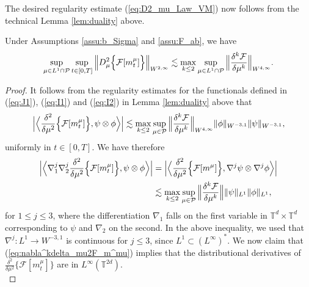 The desired regularity estimate (\ref{eq:D2_mu_Law_VM}) now follows from the technical Lemma \ref{lem:duality} above.

\begin{cor}\label{thm:reg_D_mu2F_m_mu} Under Assumptions \ref{assu:b_Sigma} and \ref{assu:F_ab}, we have
\begin{equation}\label{eq:reg_D_mu2}
\sup_{\mu \in L^1 \cap \mathcal{P}} \sup_{t \in [0,T] } \Big\| D_{\mu}^2\Big\{\mathcal{F}[m_t^{\mu}]\Big\}\Big\|_{W^{2,\infty}} \lesssim \max_{k \leq 2}\sup_{\mu \in L^1 \cap \mathcal{P}}\Big\|\frac{\delta^k \mathcal{F}}{\delta \mu^k}  \Big\|_{W^{4,\infty}}.
\end{equation}
\end{cor}

\begin{proof}
It follows from the regularity estimates for the functionals defined in (\ref{eq:J1}), (\ref{eq:I1}) and (\ref{eq:I2}) in Lemma \ref{lem:duality} above that
\begin{equation*}
\Big|\Big\langle \frac{\delta^2}{\delta \mu^2}\Big\{\mathcal{F}[m_t^{\mu}]\Big\}, \psi\otimes \phi \Big\rangle\Big| \lesssim \max_{k \leq 2} \sup_{\mu \in \mathcal{P}}\Big\|\frac{\delta^k \mathcal{F}}{\delta \mu^k}  \Big\|_{W^{4,\infty}} \|\phi\|_{W^{-3,1}} \|\psi\|_{W^{-3,1}},
\end{equation*}
uniformly in $t \in [0,T]$. We have therefore
\begin{equation}\label{eq:nabla^kdelta_mu2F_m^mu}
\begin{split}
\Big|\Big\langle \nabla_1^j \nabla_2^j \frac{\delta^2}{\delta \mu^2}\Big\{\mathcal{F}[m_t^{\mu}]\Big\}, \psi\otimes \phi \Big\rangle\Big| & = \Big|\Big\langle \frac{\delta^2}{\delta \mu^2}\Big\{\mathcal{F}[m^{\mu}]\Big\},  \nabla^j\psi\otimes  \nabla^j\phi \Big\rangle\Big| \\
& \lesssim\max_{k \leq 2} \sup_{\mu \in \mathcal{P}}\Big\|\frac{\delta^k \mathcal{F}}{\delta \mu^k}\Big\|\|\psi\|_{L^1} \|\phi\|_{L^1},
\end{split}
\end{equation}
for $1 \leq j \leq 3$, where the differentiation $\nabla_1$ falls on the first variable in $\mathbb{T}^d\times \mathbb{T}^d$ corresponding to $\psi$ and $\nabla_2$ on the second. In the above inequality, we used that $\nabla^j:L^1\to W^{-3,1}$ is continuous for $j\leq3$, since $L^1 \subset (L^{\infty})^{\ast}$. We now claim that (\ref{eq:nabla^kdelta_mu2F_m^mu}) implies that the distributional derivatives of $\frac{\delta^2}{\delta \mu^2}\{\mathcal{F}[m_t^{\mu}]\}$ are in $L^{\infty}(\mathbb{T}^{2d})$.\\


\end{proof}
